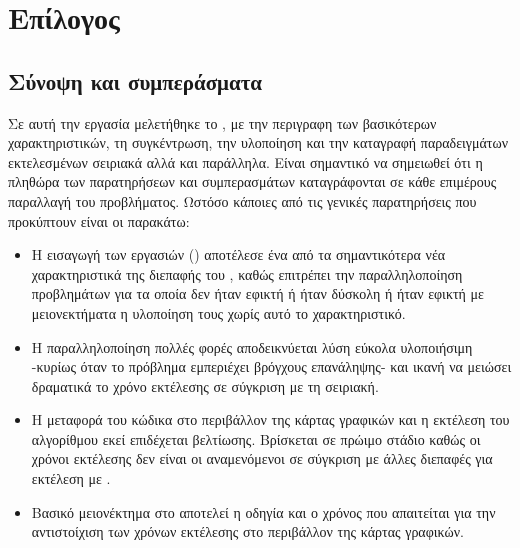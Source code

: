 \section{Επίλογος}
\subsection{Σύνοψη και συμπεράσματα}
Σε αυτή την εργασία μελετήθηκε το , με την περιγραφη των βασικότερων χαρακτηριστικών, τη συγκέντρωση, την υλοποίηση και την καταγραφή παραδειγμάτων εκτελεσμένων σειριακά αλλά και παράλληλα. Είναι σημαντικό να σημειωθεί ότι η πληθώρα των παρατηρήσεων και συμπερασμάτων καταγράφονται σε κάθε επιμέρους παραλλαγή του προβλήματος. Ωστόσο κάποιες από τις γενικές παρατηρήσεις που προκύπτουν είναι οι παρακάτω:
\begin{itemize}
\item{Η εισαγωγή των εργασιών () αποτέλεσε ένα από τα σημαντικότερα νέα χαρακτηριστικά της διεπαφής του , καθώς επιτρέπει την παραλληλοποίηση προβλημάτων για τα οποία δεν ήταν εφικτή ή ήταν δύσκολη ή ήταν εφικτή με μειονεκτήματα η υλοποίηση τους χωρίς αυτό το χαρακτηριστικό.}

\item{Η παραλληλοποίηση πολλές φορές αποδεικνύεται λύση εύκολα υλοποιήσιμη -κυρίως όταν το πρόβλημα εμπεριέχει βρόγχους επανάληψης- και ικανή να μειώσει δραματικά το χρόνο εκτέλεσης σε σύγκριση με τη σειριακή.}

\item{Η μεταφορά του κώδικα στο περιβάλλον της κάρτας γραφικών και η εκτέλεση του αλγορίθμου εκεί επιδέχεται βελτίωσης. Βρίσκεται σε πρώιμο στάδιο καθώς οι χρόνοι εκτέλεσης δεν είναι οι αναμενόμενοι σε σύγκριση με άλλες διεπαφές για εκτέλεση με .}

\item{Βασικό μειονέκτημα στο  αποτελεί η οδηγία  και ο χρόνος που απαιτείται για την αντιστοίχιση των χρόνων εκτέλεσης στο περιβάλλον της κάρτας γραφικών.}
\end{itemize}

\clearpage
